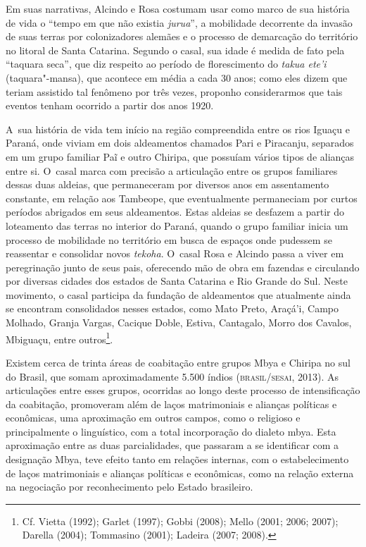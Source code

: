Em suas narrativas, Alcindo e Rosa costumam usar como marco de sua
história de vida o ``tempo em que não existia \emph{jurua}'', a mobilidade
decorrente da invasão de suas terras por colonizadores alemães e o
processo de demarcação do território no litoral de Santa Catarina.
Segundo o casal, sua idade é medida de fato pela ``taquara seca'',
que diz respeito ao período de florescimento do \emph{takua ete’i}
(taquara"-mansa), que acontece em média a cada 30 anos; como eles dizem
que teriam assistido tal fenômeno por três vezes, proponho
considerarmos que tais eventos tenham ocorrido a partir dos anos 1920.

A~sua história de vida tem início na região compreendida entre os rios
Iguaçu e Paraná, onde viviam em dois aldeamentos chamados Pari e
Piracanju, separados em um grupo familiar Paĩ e
outro Chiripa, que possuíam vários tipos de alianças entre si. O~casal
marca com precisão a articulação entre os grupos familiares dessas duas
aldeias, que permaneceram por diversos anos em assentamento constante,
em relação aos Tambeope, que eventualmente permaneciam por curtos
períodos abrigados em seus aldeamentos. Estas aldeias se desfazem a
partir do loteamento das terras no interior do Paraná, quando o grupo
familiar inicia um processo de mobilidade no território em busca de
espaços onde pudessem se reassentar e consolidar novos \emph{tekoha}. O~casal
Rosa e Alcindo passa a viver em peregrinação junto de seus pais,
oferecendo mão de obra em fazendas e circulando por diversas cidades
dos estados de Santa Catarina e Rio Grande do Sul. Neste movimento, o
casal participa da fundação de aldeamentos que atualmente ainda se
encontram consolidados nesses estados, como Mato Preto, Araçá’i, Campo
Molhado, Granja Vargas, Cacique Doble, Estiva, Cantagalo, Morro dos
Cavalos, Mbiguaçu, entre outros\footnote{Cf. Vietta (1992); Garlet
(1997); Gobbi (2008); Mello (2001; 2006; 2007); Darella (2004);
Tommasino (2001); Ladeira (2007; 2008).}.

Existem cerca de trinta áreas de coabitação entre grupos Mbya e Chiripa
no sul do Brasil, que somam aproximadamente 5.500 índios (\textsc{brasil}/\textsc{sesai},
2013). As articulações entre esses grupos, ocorridas ao longo deste processo
de intensificação da coabitação, promoveram além de laços matrimoniais
e alianças políticas e econômicas, uma aproximação em outros campos,
como o religioso e principalmente o linguístico, com a total
incorporação do dialeto mbya. Esta aproximação entre as duas
parcialidades, que passaram a se identificar com a designação Mbya,
teve efeito tanto em relações internas, com o estabelecimento de laços
matrimoniais e alianças políticas e econômicas, como na relação externa
na negociação por reconhecimento pelo Estado brasileiro.

